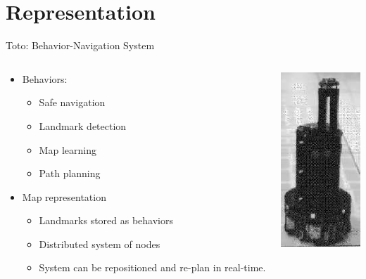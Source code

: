 \documentclass{beamer}
\begin{document}
\section{Representation}
\begin{frame}{Toto: Behavior-Navigation System}
 \begin{columns}[T]
  \begin{column}[T]{6cm}
     \begin{itemize}
      \item Behaviors:
      \begin{itemize}
	\item Safe navigation
	\item Landmark detection
	\item Map learning
	\item Path planning
      \end{itemize}
      \item Map representation
      \begin{itemize}
        \item Landmarks stored as behaviors
        \item Distributed system of nodes
        \item System can be repositioned and re-plan in real-time.
      \end{itemize}
    \end{itemize}
  \end{column}
  \begin{column}[T]{4cm}
    \includegraphics[width=3cm]{toto.png}
  \end{column}
 \end{columns}
\end{frame}
\end{document}
